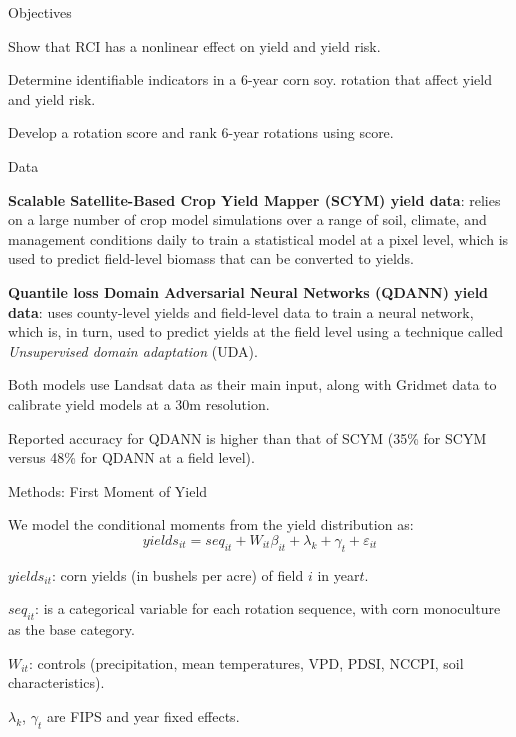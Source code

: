\documentclass[notes,11pt, aspectratio=169]{beamer}
\newenvironment{wideitemize}{\itemize\addtolength{\itemsep}{10pt}}{\enditemize}
\begin{document}
\begin{frame}{Objectives}
\begin{wideitemize}
    \item Show that RCI has a nonlinear effect on yield and yield risk.
    \item Determine identifiable indicators in a 6-year corn soy. rotation that affect yield and yield risk.
    \item Develop a rotation score and rank 6-year rotations using score.
\end{wideitemize}
\end{frame}


\begin{frame}{Data}
    \begin{wideitemize}
        \item \textbf{Scalable Satellite-Based Crop Yield Mapper (SCYM) yield data}: \citep{lobell2015} relies on a large number of crop model simulations over a range of soil, climate, and management conditions daily to train a statistical model at a pixel level, which is used to predict field-level biomass that can be converted to yields.
        \item \textbf{Quantile loss Domain Adversarial Neural Networks (QDANN) yield data}: \citep{Ma2024} uses county-level yields and field-level data to train a neural network, which is, in turn, used to predict yields at the field level using a technique called \textit{Unsupervised domain adaptation} (UDA).
        \item Both models use Landsat data as their main input, along with Gridmet data to calibrate yield models at a 30m resolution.
        \item Reported accuracy for QDANN is higher than that of SCYM (35\% for SCYM versus 48\% for QDANN at a field level).
    \end{wideitemize}
\end{frame}

\begin{frame}{Methods: First Moment of Yield}
\begin{wideitemize}
    \item We model the conditional moments from the yield distribution as:
        \begin{equation*}
    yields_{it}=seq_{it}+W_{it}\beta_{it}+\lambda_{k}+\gamma_{t}+\varepsilon_{it}
        \end{equation*}
    \item $yields_{it}$: corn yields (in bushels per acre) of field $i$ in year$t$.   
    \item $seq_{it}$: is a categorical variable for each rotation sequence, with corn monoculture as the base category.
    \item $W_{it}$: controls (precipitation, mean temperatures, VPD, PDSI, NCCPI, soil characteristics).
    \item $\lambda_{k}$, $\gamma_{t}$ are FIPS and year fixed effects.
\end{wideitemize}
\end{frame}
\end{document}
